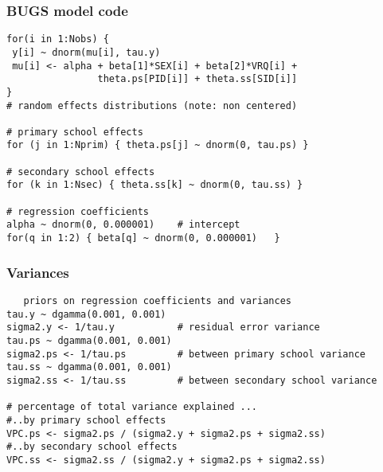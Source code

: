 \documentclass[handout]{beamer}
\begin{document}
\begin{frame}[fragile]
\frametitle{BUGS model code}

\vspace{-0.3cm}

\begin{small}
\begin{verbatim}
for(i in 1:Nobs) {
 y[i] ~ dnorm(mu[i], tau.y)
 mu[i] <- alpha + beta[1]*SEX[i] + beta[2]*VRQ[i] +
                theta.ps[PID[i]] + theta.ss[SID[i]]
}
# random effects distributions (note: non centered)

# primary school effects
for (j in 1:Nprim) { theta.ps[j] ~ dnorm(0, tau.ps) }

# secondary school effects
for (k in 1:Nsec) { theta.ss[k] ~ dnorm(0, tau.ss) }

# regression coefficients
alpha ~ dnorm(0, 0.000001)    # intercept
for(q in 1:2) { beta[q] ~ dnorm(0, 0.000001)   }
\end{verbatim}\end{small}
\end{frame}
\begin{frame}[fragile]
\frametitle{Variances}
\begin{small}\begin{verbatim}
   priors on regression coefficients and variances
tau.y ~ dgamma(0.001, 0.001)
sigma2.y <- 1/tau.y           # residual error variance
tau.ps ~ dgamma(0.001, 0.001)
sigma2.ps <- 1/tau.ps         # between primary school variance
tau.ss ~ dgamma(0.001, 0.001)
sigma2.ss <- 1/tau.ss         # between secondary school variance

# percentage of total variance explained ...
#..by primary school effects
VPC.ps <- sigma2.ps / (sigma2.y + sigma2.ps + sigma2.ss)
#..by secondary school effects
VPC.ss <- sigma2.ss / (sigma2.y + sigma2.ps + sigma2.ss)
\end{verbatim}\end{small}
\end{frame}
\end{document}
